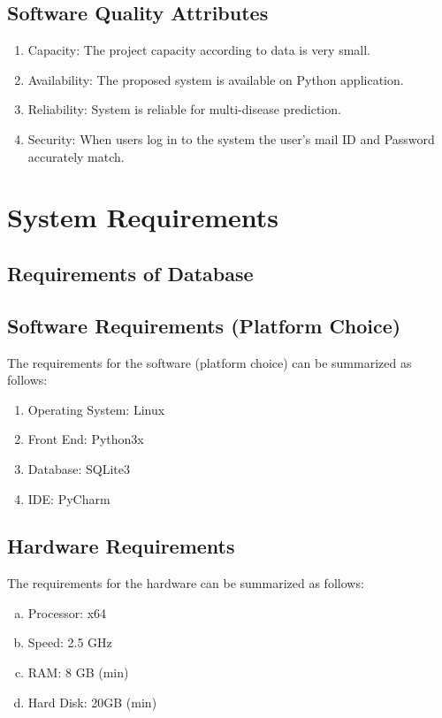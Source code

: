 \subsection{Software Quality Attributes}

\begin{enumerate}
    \item Capacity: The project capacity according to data is very small.
    \item Availability: The proposed system is available on Python application.
    \item Reliability: System is reliable for multi-disease prediction.
    \item Security: When users log in to the system the user's mail ID and Password accurately match.
\end{enumerate}


\section{System Requirements}
\subsection{Requirements of Database }
\subsection{ Software Requirements (Platform Choice)}
The requirements for the software (platform choice) can be summarized as follows:

\begin{enumerate}
    \item Operating System: Linux
    \item Front End: Python3x
    \item Database: SQLite3
    \item IDE: PyCharm
\end{enumerate}

\subsection{Hardware Requirements}

The requirements for the hardware can be summarized as follows:

\begin{enumerate}[a)]
    \item Processor: x64
    \item Speed: 2.5 GHz
    \item RAM: 8 GB (min)
    \item  Hard Disk: 20GB (min)
\end{enumerate}

